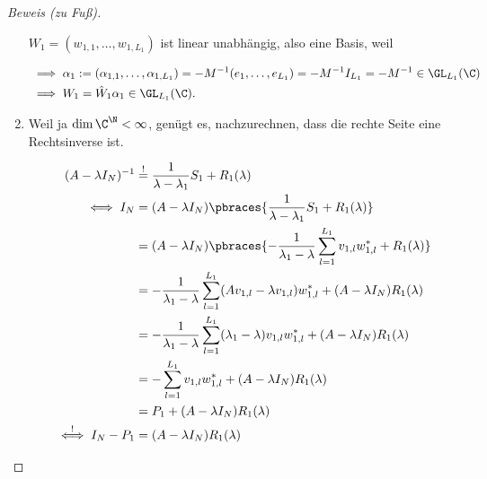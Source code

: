 \begin{proof}[Beweis (zu Fuß)]
\begin{enumerate}[label = (\roman*)]
        $W_1 = (w_{1, 1}, \dots, w_{1, L_1})$ ist linear unabhängig, also eine Basis, weil

        \begin{align*}
            & \implies
            \alpha_1
            :=
            (\alpha_{1, 1}, \dots, \alpha_{1, L_1})
            =
            -M^{-1} (e_1, \dots, e_{L_1})
            =
            -M^{-1} I_{L_1}
            =
            -M^{-1}
            \in
            \GL_{L_1}(\C) \\
            & \implies
            W_1
            =
            \hat W_1 \alpha_1
            \in
            \GL_{L_1}(\C).
        \end{align*}

        \item Weil ja $\dim \C^\N < \infty$, genügt es, nachzurechnen, dass die rechte Seite eine Rechtsinverse ist.
        
        \begin{align*}
            (A - \lambda I_N)^{-1}
            & \stackrel{!}{=}
            \frac{1}{\lambda - \lambda_1} S_1
            +
            R_1(\lambda) \\
            \iff
            I_N
            & =
            (A - \lambda I_N)
            \pbraces
            {
                \frac{1}{\lambda - \lambda_1} S_1
                +
                R_1(\lambda)
            } \\
            & =
            (A - \lambda I_N)
            \pbraces
            {
                -\frac{1}{\lambda_1 - \lambda}
                \sum_{l=1}^{L_1}
                    v_{1, l} w_{1, l}^\ast
                +
                R_1(\lambda)
            } \\
            & =
            -\frac{1}{\lambda_1 - \lambda}
            \sum_{l=1}^{L_1}
                (
                    A v_{1, l}
                    -
                    \lambda v_{1, l}
                )
                w_{1, l}^\ast
            +
            (A - \lambda I_N) R_1(\lambda) \\
            & =
            -\frac{1}{\lambda_1 - \lambda}
            \sum_{l=1}^{L_1}
                (\lambda_1 - \lambda) v_{1, l} w_{1, l}^\ast
            +
            (A - \lambda I_N)
            R_1(\lambda) \\
            & =
            -\sum_{l=1}^{L_1}
                v_{1, l} w_{1, l}^\ast
            +
            (A - \lambda I_N)
            R_1(\lambda) \\
            & =
            P_1
            +
            (A - \lambda I_N)
            R_1(\lambda) \\
            \stackrel{!}{\iff}
            I_N - P_1
            & =
            (A - \lambda I_N) R_1(\lambda)
        \end{align*}


\end{enumerate}
\end{proof}
